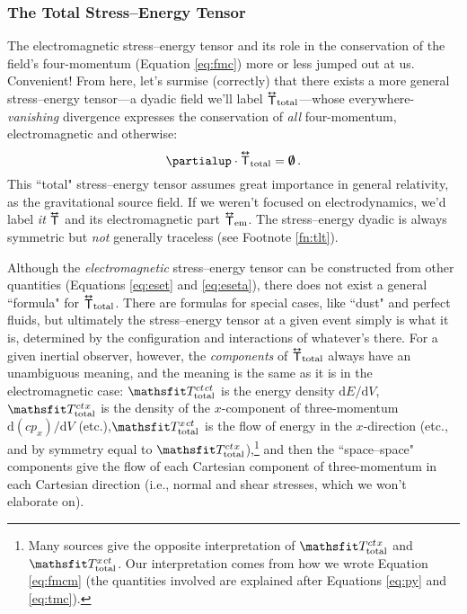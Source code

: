 \documentclass[12pt]{article}
\newcommand{\dd}[1]{\mathrm{d}#1}
\newcommand{\tightoverset}[2]{%
  \mathop{#2}\limits^{\vbox to -.5ex{\kern-0.75ex\hbox{$#1$}\vss}}}
\newcommand{\inlinedy}[1]{\tightoverset{\text{\tiny$\bm\leftrightarrow$}}{#1}}
\newcommand{\capdy}[1]{ \overset{ \text{\tiny$\bm\leftrightarrow$} }{\vphantom{\text{\small{A}}}\smash{#1}} }
\begin{document}
\subsubsection{The Total Stress--Energy Tensor}

The electromagnetic stress--energy tensor and its role in the conservation of the field's four-momentum (Equation \ref{eq:fmc}) more or less jumped out at us. Convenient! From here, let's surmise (correctly) that there exists a more general stress--energy tensor---a dyadic field we'll label ${\inlinedy{\mathsf{T}}} _{\textrm{total}}$---whose everywhere-\emph{vanishing} divergence expresses the conservation of \emph{all} four-momentum, electromagnetic and otherwise:
\begin{equation}\label{eq:set}
\partialup \cdot \capdy{\mathsf{T}} _{\mathrm{total}} = \textrm{\mbox{\boldmath $\emptyset$}} \, .
\end{equation}
This ``total" stress--energy tensor assumes great importance in general relativity, as the gravitational source field. If we weren't focused on electrodynamics, we'd label \emph{it} $\inlinedy{\mathsf{T}}$ and its electromagnetic part ${\inlinedy{\mathsf{T}}} _{\textrm{em}}$. The stress--energy dyadic is always symmetric but \emph{not} generally traceless (see Footnote \ref{fn:tlt}).

Although the \emph{electromagnetic} stress--energy tensor can be constructed from other quantities (Equations \ref{eq:eset} and \ref{eq:eseta}), there does not exist a general ``formula" for ${\inlinedy{\mathsf{T}}} _{\textrm{total}}$. There are formulas for special cases, like ``dust" and perfect fluids, but ultimately the stress--energy tensor at a given event simply is what it is, determined by the configuration and interactions of whatever's there. For a given inertial observer, however, the \emph{components} of ${\inlinedy{\mathsf{T}}} _{\textrm{total}}$ always have an unambiguous meaning, and the meaning is the same as it is in the electromagnetic case: $\mathsfit T^{ct \mkern1.5mu ct}_{\textrm{total}}$ is the energy density $\dd E / \dd V$, $\mathsfit T^{ct \mkern1.5mu x}_{\textrm{total}}$ is the density of the $x$-component of three-momentum $\dd (c p_x) / \dd V$ (etc.),$\mathsfit T^{x \mkern1.5mu ct}_{\textrm{total}}$ is the flow of energy in the $x$-direction (etc., and by symmetry equal to $\mathsfit T^{ct \mkern1.5mu x}_{\textrm{total}}$),\footnote{Many sources give the opposite interpretation of $\mathsfit T^{ct \mkern1.5mu x}_{\textrm{total}}$ and $\mathsfit T^{x \mkern1.5mu ct}_{\textrm{total}}$. Our interpretation comes from how we wrote Equation \ref{eq:fmcm} (the quantities involved are explained after Equations \ref{eq:py} and \ref{eq:tmc}).} and then the ``space--space" components give the flow of each Cartesian component of three-momentum in each Cartesian direction (i.e., normal and shear stresses, which we won't elaborate on).
\end{document}
